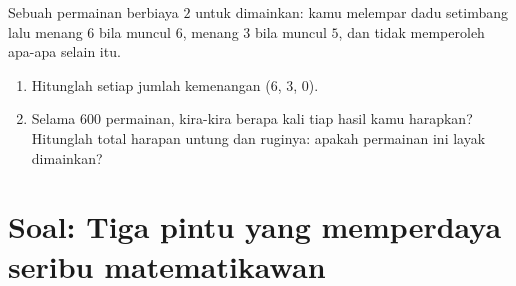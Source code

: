 \begin{exercise}[$\star\star\star$]\label{exo:g10:proba:9}
Sebuah permainan berbiaya $2$ untuk dimainkan: kamu melempar dadu setimbang
lalu menang $6$ bila muncul $6$, menang $3$ bila muncul $5$, dan tidak
memperoleh apa-apa selain itu.
\begin{enumerate}
  \item Hitunglah  setiap jumlah kemenangan ($6$, $3$, $0$).
  \item Selama $600$ permainan, kira-kira berapa kali tiap hasil kamu harapkan?
        Hitunglah total harapan untung dan ruginya: apakah permainan ini layak
        dimainkan?
\end{enumerate}
\end{exercise}

\section{Soal: Tiga pintu yang memperdaya seribu
matematikawan}

